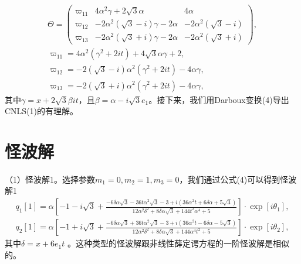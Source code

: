 \documentclass[11pt,a4paper]{ctexart}
\begin{document}
\begin{gather*}
	\Theta=\begin{pmatrix}
		\varpi_{11} & 4\alpha^{2} \gamma+2\sqrt{3}\alpha      & 4\alpha                   \\
		\varpi_{12} & -2\alpha^{2} (\sqrt{3}-i)\gamma-2\alpha & -2\alpha^{2} (\sqrt{3}-i) \\
		\varpi_{13} & -2\alpha^{2} (\sqrt{3}+i)\gamma-2\alpha & -2\alpha^{2} (\sqrt{3}+i)
	\end{pmatrix}, \\
	\varpi_{11} =4\alpha^{2} (\gamma^{2} +2it)+4\sqrt{3}\alpha\gamma+2,                      \\
	\varpi_{12} =-2(\sqrt{3}-i)\alpha^{2} (\gamma^{2} +2it)-4\alpha\gamma,\\
	\varpi_{13} =-2(\sqrt{3}+i)\alpha^{2} (\gamma^{2} +2it)-4\alpha\gamma,
\end{gather*}
其中$ \gamma=x+2\sqrt{3}\beta it $，且$ \beta=\alpha-i\sqrt{3}e_{1}  $。接下来，我们用Darboux变换(4)导出CNLS(1)的有理解。

\section{怪波解}

（1）怪波解1。选择参数$ m_{1} =0,m_{2} =1,m_{3} =0 $，我们通过公式(4)可以得到怪波解1
\begin{align*}
	q_{1} [1]=\alpha[-1-i\sqrt{3}+\frac{-6\delta\alpha\sqrt{3}-36t\alpha^{2}\sqrt{3}-3+i(36\alpha^{2} t+6\delta\alpha+5\sqrt{3})}{12\alpha^{2} \delta^{2} +8\delta\alpha\sqrt{3}+144t^{2} \alpha^{4} +5}]\cdot\exp[i\theta_{1} ], \\
	q_{2} [1]=\alpha[-1+i\sqrt{3}+\frac{-6\delta\alpha\sqrt{3}+36t\alpha^{2} \sqrt{3}-3+i(36\alpha^{2} t-6\delta\alpha-5\sqrt{3})}{12\alpha^{2} \delta^{2} +8\delta\alpha\sqrt{3}+144\alpha^{4} t^{2} +5}]\cdot\exp[i\theta_{2} ],\tag{8}
\end{align*}
其中$ \delta=x+6e_{1} t $ 。这种类型的怪波解跟非线性薛定谔方程的一阶怪波解是相似的。
\end{document}
